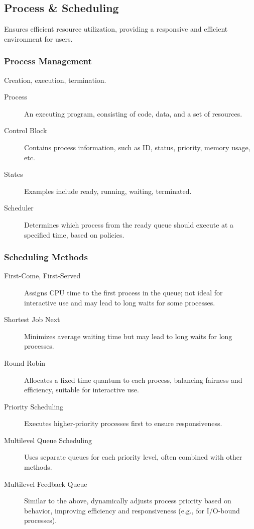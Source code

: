 \documentclass[11pt,journal,compsoc]{IEEEtran}
\begin{document}
\subsection{Process \& Scheduling}

Ensures efficient resource utilization, providing a responsive and efficient environment for users.


\subsubsection{Process Management}

Creation, execution, termination.

\begin{description}
    \item[Process] An executing program, consisting of code, data, and a set of resources.
    
    \item[Control Block] Contains process information, such as ID, status, priority, memory usage, etc.
    
    \item[States] Examples include ready, running, waiting, terminated.
    
    \item[Scheduler] Determines which process from the ready queue should execute at a specified time, based on policies.
\end{description}


\subsubsection{Scheduling Methods}

\begin{description}
    \item[First-Come, First-Served] Assigns CPU time to the first process in the queue; not ideal for interactive use and may lead to long waits for some processes.
    
    \item[Shortest Job Next] Minimizes average waiting time but may lead to long waits for long processes.
    
    \item[Round Robin] Allocates a fixed time quantum to each process, balancing fairness and efficiency, suitable for interactive use.
    
    \item[Priority Scheduling] Executes higher-priority processes first to ensure responsiveness.
    
    \item[Multilevel Queue Scheduling] Uses separate queues for each priority level, often combined with other methods.
    
    \item[Multilevel Feedback Queue] Similar to the above, dynamically adjusts process priority based on behavior, improving efficiency and responsiveness (e.g., for I/O-bound processes).
\end{description}
\end{document}
